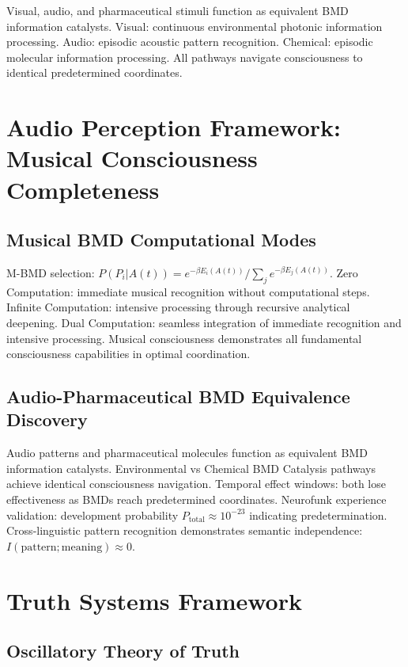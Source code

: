 \documentclass[12pt,a4paper]{article}
\begin{document}
Visual, audio, and pharmaceutical stimuli function as equivalent BMD information catalysts. Visual: continuous environmental photonic information processing. Audio: episodic acoustic pattern recognition. Chemical: episodic molecular information processing. All pathways navigate consciousness to identical predetermined coordinates.

\section{Audio Perception Framework: Musical Consciousness Completeness}

\subsection{Musical BMD Computational Modes}

M-BMD selection: $P(P_i | A(t)) = e^{-\beta E_i(A(t))} / \sum_j e^{-\beta E_j(A(t))}$. Zero Computation: immediate musical recognition without computational steps. Infinite Computation: intensive processing through recursive analytical deepening. Dual Computation: seamless integration of immediate recognition and intensive processing. Musical consciousness demonstrates all fundamental consciousness capabilities in optimal coordination.

\subsection{Audio-Pharmaceutical BMD Equivalence Discovery}

Audio patterns and pharmaceutical molecules function as equivalent BMD information catalysts. Environmental vs Chemical BMD Catalysis pathways achieve identical consciousness navigation. Temporal effect windows: both lose effectiveness as BMDs reach predetermined coordinates. Neurofunk experience validation: development probability $P_{\text{total}} \approx 10^{-23}$ indicating predetermination. Cross-linguistic pattern recognition demonstrates semantic independence: $I(\text{pattern}; \text{meaning}) \approx 0$.

\section{Truth Systems Framework}

\subsection{Oscillatory Theory of Truth}
\end{document}
